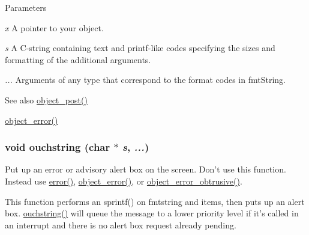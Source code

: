 \begin{DoxyParams}{Parameters}
\item[{\em x}]A pointer to your object. \item[{\em s}]A C-\/string containing text and printf-\/like codes specifying the sizes and formatting of the additional arguments. \item[{\em ...}]Arguments of any type that correspond to the format codes in fmtString.\end{DoxyParams}
\begin{DoxySeeAlso}{See also}
\hyperlink{group__console_gafb92b17363269d4d26de1823cbc2492d}{object\_\-post()} 

\hyperlink{group__console_ga05f7fed66fafc6e4d2e372b7f0fe4e43}{object\_\-error()} 
\end{DoxySeeAlso}
\hypertarget{group__console_ga4cba33c91c6a8aa3d886e746e04f21af}{
\subsubsection[{ouchstring}]{\setlength{\rightskip}{0pt plus 5cm}void ouchstring (char $\ast$ {\em s}, \/   {\em ...})}}
\label{group__console_ga4cba33c91c6a8aa3d886e746e04f21af}


Put up an error or advisory alert box on the screen. Don't use this function. Instead use \hyperlink{group__console_gaa7733e30b2951f225e24dca1ed4632b2}{error()}, \hyperlink{group__console_ga05f7fed66fafc6e4d2e372b7f0fe4e43}{object\_\-error()}, or \hyperlink{group__console_ga42a612b12b1a24380a45ab1b9278b950}{object\_\-error\_\-obtrusive()}.

This function performs an sprintf() on fmtstring and items, then puts up an alert box. \hyperlink{group__console_ga4cba33c91c6a8aa3d886e746e04f21af}{ouchstring()} will queue the message to a lower priority level if it’s called in an interrupt and there is no alert box request already pending.


